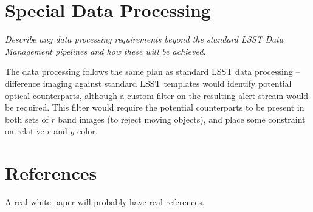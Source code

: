 \documentclass[11pt]{article}
\begin{document}
\section{Special Data Processing}
\begin{footnotesize}
{\it Describe any data processing requirements beyond the standard LSST Data Management pipelines and how these will be achieved.}
\end{footnotesize}

The data processing follows the same plan as standard LSST data processing -- difference imaging against standard LSST templates would identify potential optical counterparts, although a custom filter on the resulting alert stream would be required. This filter would require the potential counterparts to be present in
both sets of $r$ band images (to reject moving objects), and place some constraint on relative $r$ and $y$ color. 

\section{References}
A real white paper will probably have real references. 
\end{document}
